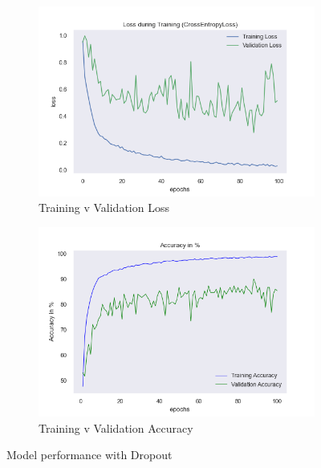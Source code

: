 \documentclass[a4paper]{article}
\begin{document}
\begin{figure}[H]
\centering
\begin{subfigure}{0.5\textwidth}
  \centering
  \includegraphics[width=1\linewidth]{img/baptiste/baptiste_100epoches_val_loss__Dropouts_True__BatchNorm_False.png}
  \caption{Training v Validation Loss}
  \label{fig:sub1}
\end{subfigure}%
\begin{subfigure}{0.5\textwidth}
  \centering
  \includegraphics[width=1\linewidth]{img/baptiste/baptiste_100epoches_train_accuracy__Dropouts_True__BatchNorm_False.png}
  \caption{Training v Validation Accuracy}
  \label{fig:sub2}
\end{subfigure}
\caption{Model performance with Dropout}
\label{fig:with-dropout}
\end{figure}
\end{document}
